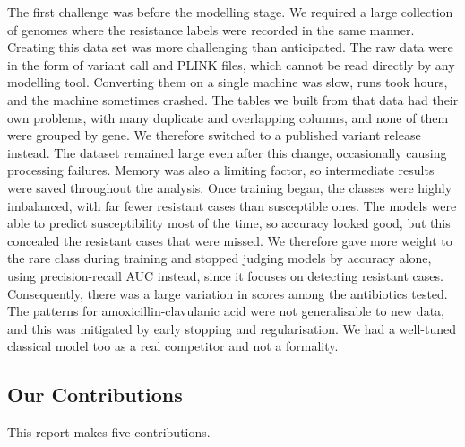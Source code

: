 \documentclass[journal]{IEEEtran}
\begin{document}
The first challenge was before the modelling stage. We required a large collection
of genomes where the resistance labels were recorded in the same manner. Creating
this data set was more challenging than anticipated. The raw data were in the form
of variant call and PLINK \cite{purcell2007plink} files, which cannot be read
directly by any modelling tool. Converting them on a single machine was slow, runs took hours, and the
machine sometimes crashed. The tables we built from that data had their own
problems, with many duplicate and overlapping columns, and none of them were
grouped by gene. We therefore switched to a published variant release instead. The
dataset remained large even after this change, occasionally causing processing
failures. Memory was also a limiting factor, so intermediate results were saved
throughout the analysis. Once training began, the classes were highly imbalanced,
with far fewer resistant cases than susceptible ones. The models were able to
predict susceptibility most of the time, so accuracy looked good, but this
concealed the resistant cases that were missed. We therefore gave more weight to
the rare class during training and stopped judging models by accuracy alone, using
precision-recall AUC instead, since it focuses on detecting resistant cases.
Consequently, there was a large variation in scores among the antibiotics tested.
The patterns for amoxicillin-clavulanic acid were not generalisable to new data,
and this was mitigated by early stopping and regularisation. We had a well-tuned
classical model too as a real competitor and not a formality.

\subsection{Our Contributions}

This report makes five contributions.
\end{document}
